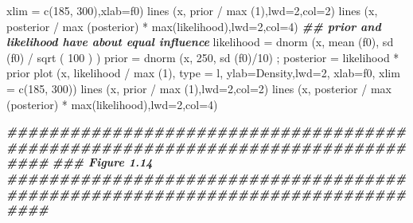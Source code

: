 \documentclass[
]{book}
\newenvironment{Shaded}{\begin{snugshade}}{\end{snugshade}}
\newcommand{\AttributeTok}[1]{\textcolor[rgb]{0.77,0.63,0.00}{#1}}
\newcommand{\DecValTok}[1]{\textcolor[rgb]{0.00,0.00,0.81}{#1}}
\newcommand{\DocumentationTok}[1]{\textcolor[rgb]{0.56,0.35,0.01}{\textbf{\textit{#1}}}}
\newcommand{\FunctionTok}[1]{\textcolor[rgb]{0.00,0.00,0.00}{#1}}
\newcommand{\NormalTok}[1]{#1}
\newcommand{\OtherTok}[1]{\textcolor[rgb]{0.56,0.35,0.01}{#1}}
\newcommand{\SpecialCharTok}[1]{\textcolor[rgb]{0.00,0.00,0.00}{#1}}
\newcommand{\StringTok}[1]{\textcolor[rgb]{0.31,0.60,0.02}{#1}}
\begin{document}
\begin{Shaded}
\begin{Highlighting}[]
      \AttributeTok{xlim =} \FunctionTok{c}\NormalTok{(}\DecValTok{185}\NormalTok{, }\DecValTok{300}\NormalTok{),}\AttributeTok{xlab=}\StringTok{\textquotesingle{}f0\textquotesingle{}}\NormalTok{)}
\FunctionTok{lines}\NormalTok{ (x, prior }\SpecialCharTok{/} \FunctionTok{max}\NormalTok{ (}\DecValTok{1}\NormalTok{),}\AttributeTok{lwd=}\DecValTok{2}\NormalTok{,}\AttributeTok{col=}\DecValTok{2}\NormalTok{)}
\FunctionTok{lines}\NormalTok{ (x, posterior }\SpecialCharTok{/} \FunctionTok{max}\NormalTok{ (posterior) }\SpecialCharTok{*} \FunctionTok{max}\NormalTok{(likelihood),}\AttributeTok{lwd=}\DecValTok{2}\NormalTok{,}\AttributeTok{col=}\DecValTok{4}\NormalTok{)}
\DocumentationTok{\#\# prior and likelihood have about equal influence}
\NormalTok{likelihood }\OtherTok{=} \FunctionTok{dnorm}\NormalTok{ (x, }\FunctionTok{mean}\NormalTok{ (f0), }\FunctionTok{sd}\NormalTok{ (f0) }\SpecialCharTok{/} \FunctionTok{sqrt}\NormalTok{ ( }\DecValTok{100}\NormalTok{ ) )}
\NormalTok{prior }\OtherTok{=} \FunctionTok{dnorm}\NormalTok{ (x, }\DecValTok{250}\NormalTok{, }\FunctionTok{sd}\NormalTok{ (f0)}\SpecialCharTok{/}\DecValTok{10}\NormalTok{) ; posterior }\OtherTok{=}\NormalTok{ likelihood }\SpecialCharTok{*}\NormalTok{ prior}
\FunctionTok{plot}\NormalTok{ (x, likelihood }\SpecialCharTok{/} \FunctionTok{max}\NormalTok{ (}\DecValTok{1}\NormalTok{), }\AttributeTok{type =} \StringTok{\textquotesingle{}l\textquotesingle{}}\NormalTok{, }\AttributeTok{ylab=}\StringTok{\textquotesingle{}Density\textquotesingle{}}\NormalTok{,}\AttributeTok{lwd=}\DecValTok{2}\NormalTok{, }\AttributeTok{xlab=}\StringTok{\textquotesingle{}f0\textquotesingle{}}\NormalTok{,}
      \AttributeTok{xlim =} \FunctionTok{c}\NormalTok{(}\DecValTok{185}\NormalTok{, }\DecValTok{300}\NormalTok{))}
\FunctionTok{lines}\NormalTok{ (x, prior }\SpecialCharTok{/} \FunctionTok{max}\NormalTok{ (}\DecValTok{1}\NormalTok{),}\AttributeTok{lwd=}\DecValTok{2}\NormalTok{,}\AttributeTok{col=}\DecValTok{2}\NormalTok{)}
\FunctionTok{lines}\NormalTok{ (x, posterior }\SpecialCharTok{/} \FunctionTok{max}\NormalTok{ (posterior) }\SpecialCharTok{*} \FunctionTok{max}\NormalTok{(likelihood),}\AttributeTok{lwd=}\DecValTok{2}\NormalTok{,}\AttributeTok{col=}\DecValTok{4}\NormalTok{)}

\DocumentationTok{\#\#\#\#\#\#\#\#\#\#\#\#\#\#\#\#\#\#\#\#\#\#\#\#\#\#\#\#\#\#\#\#\#\#\#\#\#\#\#\#\#\#\#\#\#\#\#\#\#\#\#\#\#\#\#\#\#\#\#\#\#\#\#\#\#\#\#\#\#\#\#\#\#\#\#\#\#\#\#\#}
\DocumentationTok{\#\#\# Figure 1.14}
\DocumentationTok{\#\#\#\#\#\#\#\#\#\#\#\#\#\#\#\#\#\#\#\#\#\#\#\#\#\#\#\#\#\#\#\#\#\#\#\#\#\#\#\#\#\#\#\#\#\#\#\#\#\#\#\#\#\#\#\#\#\#\#\#\#\#\#\#\#\#\#\#\#\#\#\#\#\#\#\#\#\#\#\#}


\end{Highlighting}
\end{Shaded}
\end{document}
